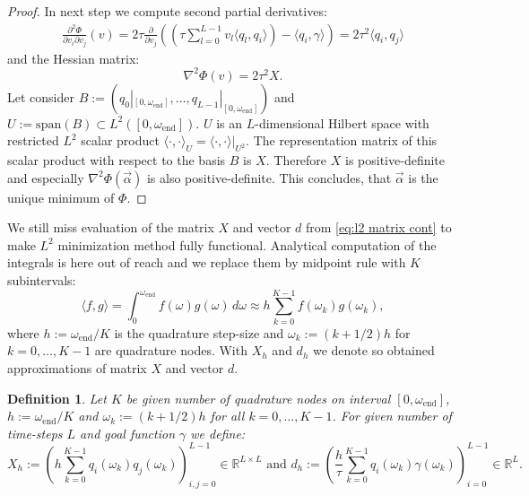 \documentclass[a4paper,11pt,bibliography=totoc,listof=totoc,headinclude=true,cleardoublepage=empty,oneside]{scrbook}
\newtheorem{definition}[theorem]{Definition}
\newcommand{\R}{\mathbb{R}}
\newcommand{\e}{\mathrm{end}}
\begin{document}
\begin{proof}
 In next step we compute second partial derivatives:
    \begin{align*}
        \frac{\partial^2 \Phi}{\partial v_i \partial v_j}(v) = 2\tau \frac{\partial}{\partial v_j }  \left( \left( \tau\sum_{l=0}^{L-1} v_l \langle q_l, q_i\rangle \right) - \langle q_i, \gamma\rangle \right) = 2\tau^2 \langle q_i, q_j \rangle
    \end{align*}
    and the Hessian matrix:
    \begin{equation*}
        \nabla^2 \Phi(v) = 2 \tau^2 X.
    \end{equation*}
    Let consider $B:=\left(q_0|_{[0, \omega_\e]}, \dots, q_{L-1}|_{[0, \omega_\e]}\right)$ and $U := \mathrm{span}(B) \subset L^2\left([0, \omega_\e]\right)$. $U$ is an $L$-dimensional Hilbert space with restricted $L^2$ scalar product $\langle \cdot, \cdot \rangle_U = \langle \cdot , \cdot \rangle|_{U^2}$. The representation matrix of this scalar product with respect to the basis $B$ is $X$. Therefore $X$ is positive-definite and especially $\nabla^2\Phi(\Vec{\alpha})$ is also positive-definite. This concludes, that $\Vec{\alpha}$ is the unique minimum of $\Phi$. 
\end{proof}

We still miss evaluation of the matrix $X$ and vector $d$ from \eqref{eq:l2 matrix cont} to make $L^2$ minimization method fully functional. Analytical computation of the integrals is here out of reach and we replace them by midpoint rule with $K$ subintervals:
\begin{equation*}
    \langle f, g \rangle = \int_0^{\omega_\e} f(\omega) g(\omega) \, d\omega \approx h \sum_{k=0}^{K-1} f(\omega_k)g(\omega_k), 
\end{equation*}
where $h := \omega_\e/K$ is the quadrature step-size and $\omega_k := (k+1/2)h$ for $k = 0, \dots, K-1$ are quadrature nodes. With $X_h$ and $d_h$ we denote so obtained approximations of matrix $X$ and vector $d$.

\begin{definition}\label{def:Xh}
    Let $K$ be given number of quadrature nodes on interval $[0, \omega_\e]$, $h := \omega_\e/K$ and $\omega_k := (k+1/2)h$ for all $k = 0, \dots, K-1$. For given number of time-steps $L$ and goal function $\gamma$ we define:
    \begin{equation*}
        X_h := \left(h\sum_{k=0}^{K-1} q_i(\omega_k)q_j(\omega_k)\right)_{i,j = 0}^{L-1} \in \R^{L\times L} \text{ and } d_h := \left(\frac{h}{\tau}\sum_{k=0}^{K-1} q_i(\omega_k)\gamma(\omega_k) \right)_{i=0}^{L-1} \in \R^L.
    \end{equation*}
\end{definition}
\end{document}
